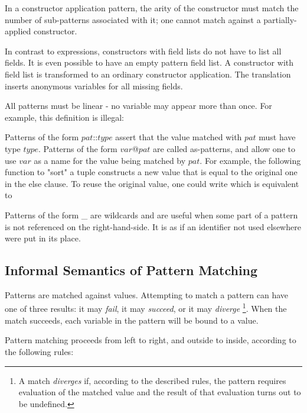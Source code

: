 In a constructor application pattern, the arity of the constructor must match the number of sub-patterns associated with it; one cannot match against a partially-applied constructor.

In contrast to expressions, constructors with field lists do not have to list all fields. It is even possible to have an empty pattern field list. A constructor with field list is transformed to an ordinary constructor application. The translation inserts anonymous variables for all missing fields.

All patterns must be linear - no variable may appear more than once. For example, this definition is illegal:

Patterns of the form $pat$::$type$ assert that the value matched with $pat$ must have type $type$.
Patterns of the form
$var$@$pat$
are called as-patterns, and allow one to use
$var$
as a name for the
value being matched by $pat$. For example, the following function to "sort" a tuple
constructs a new value that is equal to the original one in the else clause. To reuse the original value, one could write
which is equivalent to

Patterns of the form \_ are wildcards and are useful when some part of a pattern is not referenced on
the right-hand-side. It is as if an identifier not used elsewhere were put in its place.

\subsection{Informal Semantics of Pattern Matching} 

Patterns are matched against values. Attempting to match a pattern can have one of three results: it may \emph{fail}, it may \emph{succeed}, or it may \emph{diverge}
\footnote{A match \emph{diverges} if, according to the described rules, the pattern requires evaluation of the matched value and the result of that evaluation turns out to be undefined.}.
When the match succeeds, each variable in the pattern will be bound to a value.

Pattern matching proceeds from left to right, and outside to inside, according to the following rules:

